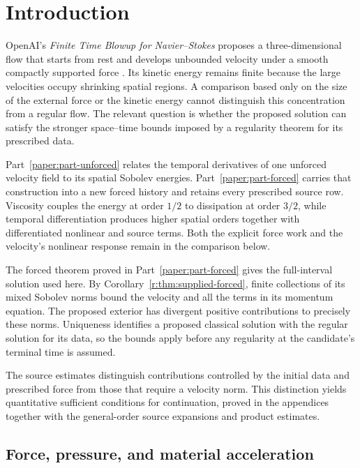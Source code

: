 \section{Introduction}\label{r:sec:introduction}

OpenAI's \emph{Finite Time Blowup for Navier--Stokes} proposes a
three-dimensional flow that starts from rest and develops unbounded
velocity under a smooth compactly supported force
\cite[Theorem~1.1]{openai-paper}. Its kinetic energy remains finite
because the large velocities occupy shrinking spatial regions.
A comparison based only on the size of the external force or the
kinetic energy cannot distinguish this concentration from a regular
flow. The relevant question is whether the proposed solution can
satisfy the stronger space--time bounds imposed by a regularity theorem
for its prescribed data.

Part~\ref{paper:part-unforced} relates the temporal derivatives of one unforced velocity field to
its spatial Sobolev energies. Part~\ref{paper:part-forced} carries that construction into a new
forced history and retains every prescribed source row. Viscosity couples the
energy at order \(1/2\) to dissipation at order \(3/2\), while temporal
differentiation produces higher spatial orders together with differentiated
nonlinear and source terms. Both the explicit force work and the velocity's
nonlinear response remain in the comparison below.

The forced theorem proved in Part~\ref{paper:part-forced} gives the full-interval solution used
here.  By Corollary~\ref{r:thm:supplied-forced}, finite collections of its mixed Sobolev norms bound
the velocity and all the terms in its momentum equation. The proposed
exterior has divergent positive contributions to precisely these
norms. Uniqueness identifies a proposed classical solution with the
regular solution for its data, so the bounds apply before any
regularity at the candidate's terminal time is assumed.

The source estimates distinguish contributions controlled by the
initial data and prescribed force from those that require a velocity
norm. This distinction yields quantitative sufficient conditions for
continuation, proved in the appendices together with the general-order
source expansions and product estimates.

\subsection{Force, pressure, and material acceleration}

